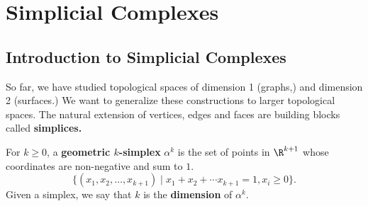 \chapter{Simplicial Complexes}
\section{Introduction to Simplicial Complexes}
\label{sec:simplicial:simplicial}
So far, we have studied topological spaces of dimension 1 (graphs,) and dimension 2 (surfaces.) We want to generalize these constructions to larger topological spaces. The natural extension of vertices, edges and faces are building blocks called \textbf{simplices.}
\begin{definition}
	For $k\geq 0$,  a \textbf{geometric $k$-simplex} $\alpha^k$ is the set of points in $\R^{k+1}$ whose coordinates are non-negative and sum to $1$. 
	\[\{(x_1, x_2, \ldots,  x_{k+1})\;| \; x_1+x_2+\cdots x_{k+1}=1,  x_i\geq 0\}.\]
	Given a simplex,  we say that $k$ is the \textbf{dimension} of $\alpha^k$. 
\end{definition}


